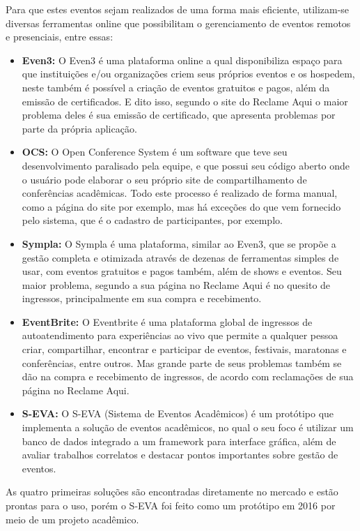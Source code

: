 Para que estes eventos sejam realizados de uma forma mais eficiente, utilizam-se diversas ferramentas online que possibilitam o gerenciamento de eventos remotos e presenciais, entre essas:
\begin{itemize}
    \item \textbf{Even3: }O Even3 é uma plataforma online a qual disponibiliza espaço para que instituições e/ou organizações criem seus próprios eventos e os hospedem, neste também é possível a criação de eventos gratuitos e pagos, além da emissão de certificados. E dito isso, segundo o site do Reclame Aqui o maior problema deles é sua emissão de certificado, que apresenta problemas por parte da própria aplicação.
    \item \textbf{OCS:} O Open Conference System é um software que teve seu desenvolvimento paralisado pela equipe, e que possui seu código aberto onde o usuário pode elaborar o seu próprio site de compartilhamento de conferências acadêmicas. Todo este processo é realizado de forma manual, como a página do site por exemplo, mas há exceções do que vem fornecido pelo sistema, que é o cadastro de participantes, por exemplo.
    \item \textbf{Sympla: }O Sympla é uma plataforma, similar ao Even3, que se propõe a gestão completa e otimizada através de dezenas de ferramentas simples de usar, com eventos gratuitos e pagos também, além de shows e eventos. Seu maior problema, segundo a sua página no Reclame Aqui é no quesito de ingressos, principalmente em sua compra e recebimento.
    \item \textbf{EventBrite: }O Eventbrite é uma plataforma global de ingressos de autoatendimento para experiências ao vivo que permite a qualquer pessoa criar, compartilhar, encontrar e participar de eventos, festivais, maratonas e conferências, entre outros. Mas grande parte de seus problemas também se dão na compra e recebimento de ingressos, de acordo com reclamações de sua página no Reclame Aqui.
    \item \textbf{S-EVA: }O S-EVA (Sistema de Eventos Acadêmicos) é um protótipo que implementa a solução de eventos acadêmicos, no qual o seu foco é utilizar um banco de dados integrado a um framework para interface gráfica, além de avaliar trabalhos correlatos e destacar pontos importantes sobre gestão de eventos.
\end{itemize}

As quatro primeiras soluções são encontradas diretamente no mercado e estão prontas para o uso, porém o S-EVA foi feito como um protótipo em 2016 por meio de um projeto acadêmico.

